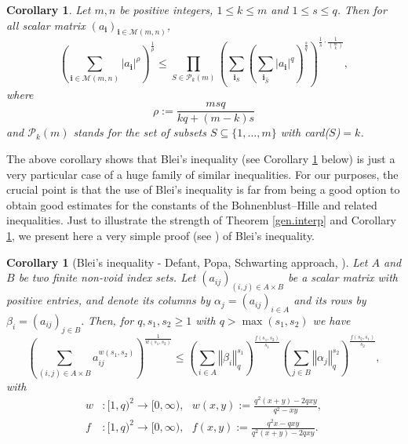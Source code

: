 \documentclass[10pt]{amsart}
\newtheorem{corollary}[theorem]{Corollary}
\numberwithin{equation}{section}
\begin{document}
\begin{corollary}
\label{cor33} \label{blei.interp} Let $m,n$ be positive integers, $1\leq
k\leq m$ and $1\leq s\leq q$. Then for all scalar matrix $\left( a_{\mathbf{i}}\right) _{\mathbf{i}\in \mathcal{M}(m,n)}$,
\begin{equation*}
\left( \sum_{\mathbf{i}\in \mathcal{M}(m,n)}\left\vert a_{\mathbf{i}}\right\vert ^{\rho }\right) ^{\frac{1}{\rho }}\leq \prod_{S\in \mathcal{P}_{k}\left( m\right) }\left( \sum_{\mathbf{i}_{S}}\left( \sum_{\mathbf{i}_{\widehat{S}}}\left\vert a_{\mathbf{i}}\right\vert ^{q}\right) ^{\frac{s}{q}}\right) ^{\frac{1}{s}\cdot \frac{1}{\binom{m}{k}}},
\end{equation*}where
\begin{equation*}
\rho :=\frac{msq}{kq+(m-k)s}
\end{equation*}
and $\mathcal{P}_{k}\left( m\right)$ stands for the set of subsets $S
\subseteq \{1, \ldots, m\}$ with card($S$)$=k$.
\end{corollary}

The above corollary shows that Blei's inequality (see Corollary \ref{b}
below) is just a very particular case of a huge family of similar
inequalities. For our purposes, the crucial point is that the use of Blei's
inequality is far from being a good option to obtain good estimates for the
constants of the Bohnenblust--Hille and related inequalities. Just to
illustrate the strength of Theorem \ref{gen.interp} and Corollary \ref{cor33}, we present here a very simple proof (see \cite{bps}) of Blei's inequality.

\begin{corollary}[Blei's inequality - Defant, Popa, Schwarting approach,
\protect\cite{defa}]
\label{b} Let $A$ and $B$ be two finite non-void index sets. Let $(a_{ij})_{(i,j)\in A\times B}$ be a scalar matrix with positive entries, and
denote its columns by $\alpha _{j}=(a_{ij})_{i\in A}$ and its rows by $\beta
_{i}=(a_{ij})_{j\in B}.$ Then, for $q,s_{1},s_{2}\geq 1$ with $q>\max
(s_{1},s_{2})$ we have
\begin{equation*}
\left( \sum_{(i,j)\in A\times B}a_{ij}^{w(s_{1},s_{2})}\right) ^{\frac{1}{w(s_{1},s_{2})}}\leq \left( \sum_{i\in A}\left\Vert \beta _{i}\right\Vert
_{q}^{s_{1}}\right) ^{\frac{f(s_{1},s_{2})}{s_{1}}}\left( \sum_{j\in
B}\left\Vert \alpha _{j}\right\Vert _{q}^{s_{2}}\right) ^{\frac{f(s_{2},s_{1})}{s_{2}}},
\end{equation*}
with
\begin{align*}
w& :[1,q)^{2}\rightarrow \lbrack 0,\infty ),\text{ }w(x,y):=\frac{q^{2}(x+y)-2qxy}{q^{2}-xy}, \\
f& :[1,q)^{2}\rightarrow \lbrack 0,\infty ),\text{ }f(x,y):=\frac{q^{2}x-qxy}{q^{2}(x+y)-2qxy}.
\end{align*}
\end{corollary}
\end{document}

